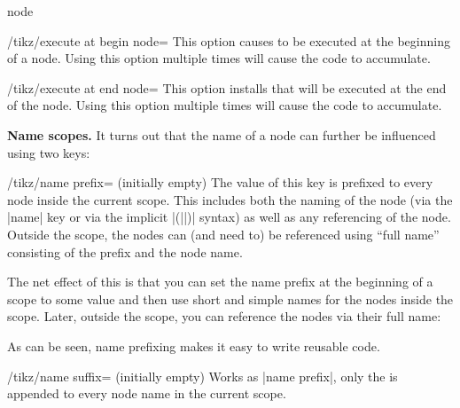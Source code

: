 \begin{pathoperation}{node}
    \begin{key}{/tikz/execute at begin node=}
        This option causes  to be executed at the beginning of a
        node. Using this option multiple times will cause the code to
        accumulate.
    \end{key}

    \begin{key}{/tikz/execute at end node=}
        This option installs  that will be executed at the end of
        the node. Using this option multiple times will cause the code to
        accumulate.
\begin{codeexample}[]
\end{codeexample}
    \end{key}

    \medskip
    \textbf{Name scopes.}
    It turns out that the name of a node can further be influenced using two
    keys:
    \begin{key}{/tikz/name prefix= (initially \normalfont empty)}
        The value of this key is prefixed to every node inside the current
        scope. This includes both the naming of the node (via the |name| key or
        via the implicit |(||)| syntax) as well as any referencing
        of the node. Outside the scope, the nodes can (and need to) be
        referenced using ``full name'' consisting of the prefix and the node
        name.

        The net effect of this is that you can set the name prefix at the
        beginning of a scope to some value and then use short and simple names
        for the nodes inside the scope. Later, outside the scope, you can
        reference the nodes via their full name:
\begin{codeexample}[]
\end{codeexample}
        As can be seen, name prefixing makes it easy to write reusable code.
    \end{key}
    \begin{key}{/tikz/name suffix= (initially \normalfont empty)}
        Works as |name prefix|, only the  is appended to every node
        name in the current scope.
    \end{key}
\end{pathoperation}

